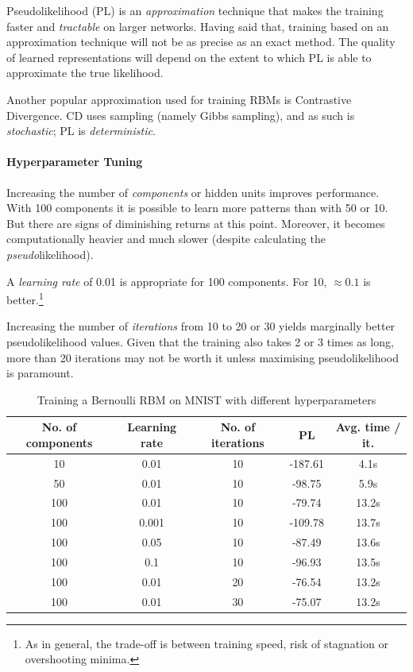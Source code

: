 Pseudolikelihood (PL) is an \textit{approximation} technique that makes the training faster and \textit{tractable} on larger networks.
Having said that, training based on an approximation technique will not be as precise as an exact method.
The quality of learned representations will depend on the extent to which PL is able to approximate the true likelihood.

Another popular approximation used for training RBMs is Contrastive Divergence.
CD uses sampling (namely Gibbs sampling), and as such is \textit{stochastic};
PL is \textit{deterministic}.

\paragraph{Hyperparameter Tuning}

Increasing the number of \textit{components} or hidden units improves performance.
With 100 components it is possible to learn more patterns than with 50 or 10.
But there are signs of diminishing returns at this point.
Moreover, it becomes computationally heavier and much slower
(despite calculating the \textit{pseudo}likelihood).

A \textit{learning rate} of 0.01 is appropriate for 100 components. For 10, $\approx 0.1$ is better.\footnote{
    As in general, the trade-off is between training speed, risk of stagnation or overshooting minima.
}

Increasing the number of \textit{iterations} from 10 to 20 or 30 yields marginally better pseudolikelihood values.
Given that the training also takes 2 or 3 times as long,
more than 20 iterations may not be worth it unless maximising pseudolikelihood is paramount.

\begin{table}[h]
\centering
\begin{tabular}{|c|c|c|c|c|}
    \hline
    No. of components & Learning rate & No. of iterations & PL & Avg. time / it. \\
    \hline
    10 & 0.01 & 10 & -187.61 & 4.1s \\
    \hline
    50 & 0.01 & 10 & -98.75 & 5.9s \\
    \hline
    100 & 0.01 & 10 & -79.74 & 13.2s \\
    \hline
    100 & 0.001 & 10 & -109.78 & 13.7s \\
    \hline
    100 & 0.05 & 10 & -87.49 & 13.6s \\
    \hline
    100 & 0.1 & 10 & -96.93 & 13.5s \\
    \hline
    100 & 0.01 & 20 & -76.54 & 13.2s \\
    \hline
    100 & 0.01 & 30 & -75.07 & 13.2s \\
    \hline
\end{tabular}
\caption{Training a Bernoulli RBM on MNIST with different hyperparameters}
\label{tab:rbm-training}
\end{table}

